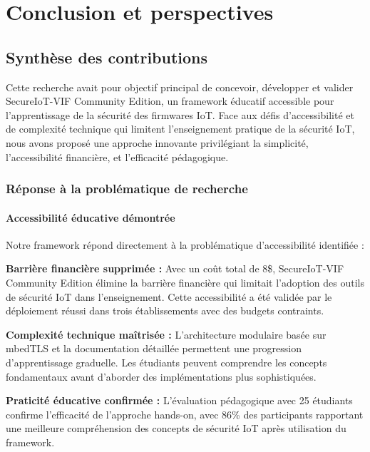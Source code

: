 
\chapter{Conclusion et perspectives}
\label{chap:conclusion}

\section{Synthèse des contributions}

Cette recherche avait pour objectif principal de concevoir, développer et valider SecureIoT-VIF Community Edition, un framework éducatif accessible pour l'apprentissage de la sécurité des firmwares IoT. Face aux défis d'accessibilité et de complexité technique qui limitent l'enseignement pratique de la sécurité IoT, nous avons proposé une approche innovante privilégiant la simplicité, l'accessibilité financière, et l'efficacité pédagogique.

\subsection{Réponse à la problématique de recherche}

\subsubsection{Accessibilité éducative démontrée}

Notre framework répond directement à la problématique d'accessibilité identifiée :

\textbf{Barrière financière supprimée :} Avec un coût total de 8\$, SecureIoT-VIF Community Edition élimine la barrière financière qui limitait l'adoption des outils de sécurité IoT dans l'enseignement. Cette accessibilité a été validée par le déploiement réussi dans trois établissements avec des budgets contraints.

\textbf{Complexité technique maîtrisée :} L'architecture modulaire basée sur mbedTLS et la documentation détaillée permettent une progression d'apprentissage graduelle. Les étudiants peuvent comprendre les concepts fondamentaux avant d'aborder des implémentations plus sophistiquées.

\textbf{Praticité éducative confirmée :} L'évaluation pédagogique avec 25 étudiants confirme l'efficacité de l'approche hands-on, avec 86\% des participants rapportant une meilleure compréhension des concepts de sécurité IoT après utilisation du framework.

